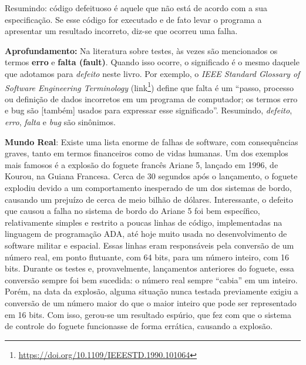\documentclass[
  11pt,
  twoside]{book}
\DeclareRobustCommand{\href}[2]{#2\footnote{\url{#1}}}
\newenvironment{esmbox}{\centering \vspace{1.5ex} \begin{tcolorbox}[breakable, colback=backcolor, width=4.9in]}{\end{tcolorbox} \vspace{1.5ex}}
\begin{document}
Resumindo: código defeituoso é aquele que não está de acordo com a sua
especificação. Se esse código for executado e de fato levar o programa a
apresentar um resultado incorreto, diz-se que ocorreu uma falha.

\begin{esmbox}

\textbf{Aprofundamento:} Na literatura sobre testes, às vezes são
mencionados os termos \textbf{erro} e \textbf{falta (fault)}. Quando
isso ocorre, o significado é o mesmo daquele que adotamos para
\emph{defeito} neste livro. Por exemplo, o \emph{IEEE Standard Glossary
of Software Engineering Terminology}
(\href{https://doi.org/10.1109/IEEESTD.1990.101064}{link}) define que
falta é um ``passo, processo ou definição de dados incorretos em um
programa de computador; os termos erro e bug são {[}também{]} usados
para expressar esse significado''. Resumindo, \emph{defeito},
\emph{erro}, \emph{falta} e \emph{bug} são sinônimos.

\end{esmbox}


\begin{esmbox}

\textbf{Mundo Real}: Existe uma lista enorme de falhas de software, com
consequências graves, tanto em termos financeiros como de vidas humanas.
Um dos exemplos mais famosos é a explosão do foguete francês Ariane 5,
lançado em 1996, de Kourou, na Guiana Francesa. Cerca de 30 segundos
após o lançamento, o foguete explodiu devido a um comportamento
inesperado de um dos sistemas de bordo, causando um prejuízo de cerca de
meio bilhão de dólares. Interessante, o defeito que causou a falha no
sistema de bordo do Ariane 5 foi bem específico, relativamente simples e
restrito a poucas linhas de código, implementadas na linguagem de
programação ADA, até hoje muito usada no desenvolvimento de software
militar e espacial. Essas linhas eram responsáveis pela conversão de um
número real, em ponto flutuante, com 64 bits, para um número inteiro,
com 16 bits. Durante os testes e, provavelmente, lançamentos anteriores
do foguete, essa conversão sempre foi bem sucedida: o número real sempre
``cabia'' em um inteiro. Porém, na data da explosão, alguma situação
nunca testada previamente exigiu a conversão de um número maior do que o
maior inteiro que pode ser representado em 16 bits. Com isso, gerou-se
um resultado espúrio, que fez com que o sistema de controle do foguete
funcionasse de forma errática, causando a explosão.

\end{esmbox}
\end{document}
